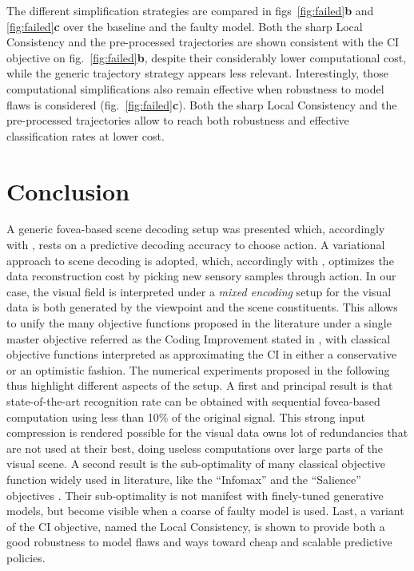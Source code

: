 \documentclass{article}
\begin{document}
The different simplification strategies are compared in figs~\ref{fig:failed}\textbf{b} and \ref{fig:failed}\textbf{c} over the baseline and the faulty model. Both the sharp Local Consistency and the pre-processed trajectories are shown consistent with the CI objective on fig.~\ref{fig:failed}\textbf{b}, despite their considerably lower computational cost, while the generic trajectory strategy appears less relevant. Interestingly, those computational simplifications also remain effective when robustness to model flaws is considered (fig.~\ref{fig:failed}\textbf{c}). 
Both the sharp Local Consistency and the pre-processed trajectories allow to reach both robustness and effective classification rates at lower cost.

\section{Conclusion}
A generic fovea-based scene decoding setup was presented which, accordingly with \cite{najemnik2005optimal}, rests on a predictive decoding accuracy to choose action. A variational approach to scene decoding is adopted, which, accordingly with \cite{friston2012perceptions}, optimizes the data reconstruction cost by picking new sensory samples through action. In our case, the visual field is interpreted under a \emph{mixed encoding} setup for the visual data is both generated by the viewpoint and the scene constituents. 
This allows to unify the many objective functions proposed in the literature under a single master objective referred as the Coding Improvement stated in \cite{schmidhuber2007simple}, with classical objective functions interpreted as 
approximating the CI in either a conservative or an optimistic fashion. The numerical experiments proposed in the following thus highlight different aspects of the setup. 
A first and principal result is that state-of-the-art recognition rate can be obtained with sequential fovea-based computation using less than 10\% of the original signal. This strong input compression is rendered possible for the visual data owns lot of redundancies that are not used at their best, doing useless computations over large parts of the visual scene. A second result is the sub-optimality of many classical objective function widely used in literature, like the ``Infomax'' \citep{butko2010infomax} and the ``Salience'' objectives \citep{itti2005bayesian}. Their sub-optimality is not manifest with finely-tuned generative models, but become visible when a coarse of faulty model is used.  
Last, a variant of the CI objective, named the Local Consistency, is shown to provide both a good robustness to model flaws and ways toward cheap and scalable predictive policies.  




\end{document}
